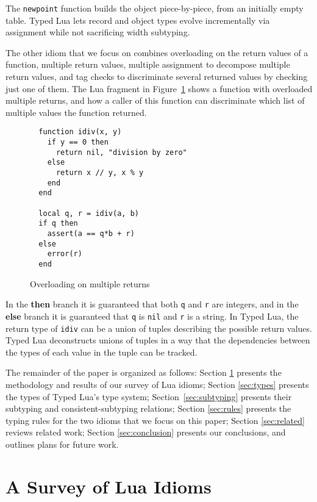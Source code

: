 \documentclass[preprint]{sigplanconf}
\begin{document}
The {\tt newpoint} function builds the object piece-by-piece,
from an initially empty table. Typed Lua
lets record and object types evolve incrementally 
via assignment while not sacrificing width subtyping.

The other idiom that we focus on combines overloading on the return values of a function, multiple return values, multiple assignment
to decompose multiple return values,
and tag checks to discriminate several returned values
by checking just one of them. The Lua fragment in Figure~\ref{fig:over} shows a function with overloaded multiple
returns, and how a caller of this function can discriminate
which list of multiple values the function returned.

\begin{figure}[t]
\label{fig:over}
\begin{verbatim}
  function idiv(x, y)
    if y == 0 then
      return nil, "division by zero"
    else
      return x // y, x % y
    end 
  end
  
  local q, r = idiv(a, b)
  if q then
    assert(a == q*b + r)
  else
    error(r)
  end
\end{verbatim}
\caption{Overloading on multiple returns}
\end{figure}

In the {\bf then} branch it is guaranteed that both {\tt q}
and {\tt r} are integers, and in the {\bf else} branch it is
guaranteed that {\tt q} is {\tt nil} and {\tt r} is a string.
In Typed Lua, the return type of {\tt idiv} can be a union of
tuples describing the possible return values. Typed Lua deconstructs unions of tuples in a way that the dependencies between the types of each value in the tuple can be tracked.

The remainder of the paper is organized as follows:
Section \ref{sec:statistics} presents the methodology and results of
our survey of Lua idioms;
Section \ref{sec:types} presents the types of Typed Lua's
type system; Section~\ref{sec:subtyping} presents
their subtyping and consistent-subtyping relations;
Section \ref{sec:rules} presents the typing rules
for the two idioms that we focus on this paper;
Section \ref{sec:related} reviews related work;
Section \ref{sec:conclusion} presents our conclusions,
and outlines plans for future work.

\section{A Survey of Lua Idioms}
\label{sec:statistics}
\end{document}
